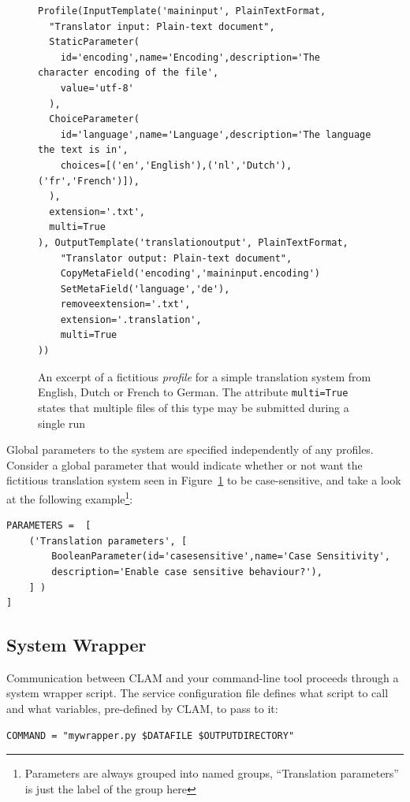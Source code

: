 \documentclass[11pt]{article}
\begin{document}
\begin{figure}[h]
{\footnotesize{
\begin{verbatim}
Profile(InputTemplate('maininput', PlainTextFormat, 
  "Translator input: Plain-text document",  
  StaticParameter(
    id='encoding',name='Encoding',description='The character encoding of the file', 
    value='utf-8'
  ),  
  ChoiceParameter(
    id='language',name='Language',description='The language the text is in', 
    choices=[('en','English'),('nl','Dutch'),('fr','French')]),
  ),      
  extension='.txt',
  multi=True
), OutputTemplate('translationoutput', PlainTextFormat,
    "Translator output: Plain-text document",  
    CopyMetaField('encoding','maininput.encoding')
    SetMetaField('language','de'),
    removeextension='.txt',
    extension='.translation',
    multi=True
))
\end{verbatim}
}}
\caption{An excerpt of a fictitious \emph{profile} for a simple translation
system from English, Dutch or French to German. The attribute
\texttt{multi=True} states that multiple files of this type may be submitted during a single run}
\label{fig:profile}
\end{figure}

Global parameters to the system are specified independently of any profiles.
Consider a global parameter that would indicate whether or not want
the fictitious translation system seen in Figure~\ref{fig:profile} to be
case-sensitive, and take a look at the following example\footnote{Parameters are always grouped into named groups,
``Translation parameters'' is just the label of the group here}:

{\footnotesize{
\begin{verbatim}
PARAMETERS =  [
    ('Translation parameters', [
        BooleanParameter(id='casesensitive',name='Case Sensitivity',
        description='Enable case sensitive behaviour?'),
    ] )
]
\end{verbatim}
}}

\subsection{System Wrapper}

Communication between CLAM and your command-line tool proceeds through a system
wrapper script. The service configuration file defines what script to call and
what variables, pre-defined by CLAM, to pass to it:

{\footnotesize{
\begin{verbatim}
COMMAND = "mywrapper.py $DATAFILE $OUTPUTDIRECTORY"
\end{verbatim}
}}
\end{document}
